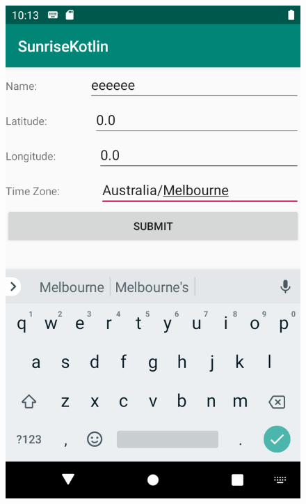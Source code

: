 \documentclass{scrartcl}
\begin{document}
\begin{figure}[h]
    \centering
    \includegraphics[scale=0.2]{images/screen3.png}

\end{figure}
\end{document}
